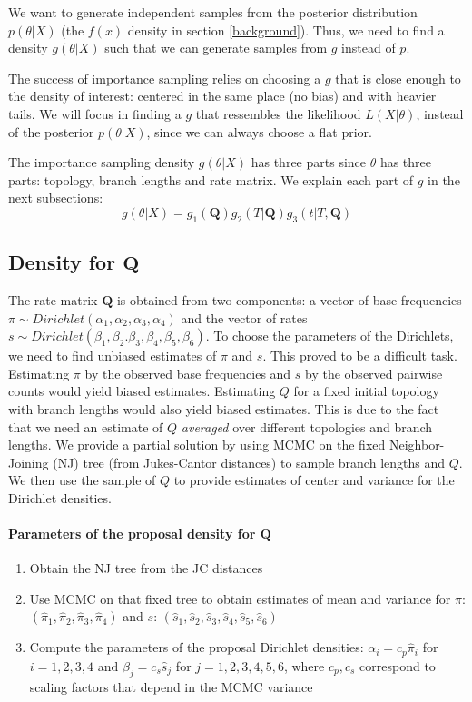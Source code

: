 \documentclass[useAMS,usenatbib]{biom}
\begin{document}
We want to generate independent samples from the posterior
distribution $p(\theta|X)$ (the $f(x)$ density in section
\ref{background}). Thus, we need to find a density $g(\theta|X)$ such
that we can generate samples from $g$ instead of $p$.

The success of importance sampling relies on choosing a $g$ that is
close enough to the density of interest: centered in the same place
(no bias) and with heavier tails. We will focus in finding a $g$ that
ressembles the likelihood $L(X|\theta)$, instead of the posterior
$p(\theta|X)$, since we can always choose a flat prior.

The importance sampling density $g(\theta|X)$ has three parts since
$\theta$ has three parts: topology, branch lengths and rate matrix. We
explain each part of $g$ in the next subsections:
\begin{equation}
g(\theta|X) = g_1(\mathbf{Q})g_2(T|\mathbf{Q})g_3(t|T,\mathbf{Q})
\end{equation}

\subsection{Density for $\mathbf{Q}$}
The rate matrix $\mathbf{Q}$ is obtained from two components: a vector
of base frequencies $\pi\sim
Dirichlet(\alpha_1,\alpha_2,\alpha_3,\alpha_4)$ and the vector of
rates $s\sim
Dirichlet(\beta_1,\beta_2.\beta_3,\beta_4,\beta_5,\beta_6)$. To choose
the parameters of the Dirichlets, we need to find unbiased estimates
of $\pi$ and $s$. This proved to be a difficult task. Estimating $\pi$
by the observed base frequencies and $s$ by the observed pairwise
counts would yield biased estimates. Estimating $Q$ for a fixed
initial topology with branch lengths would also yield biased
estimates. This is due to the fact that we need an estimate of $Q$
\textit{averaged} over different topologies and branch lengths.  We
provide a partial solution by using MCMC on the fixed Neighbor-Joining
(NJ) tree (from Jukes-Cantor distances) to sample branch lengths and
$Q$. We then use the sample of $Q$ to provide estimates of center and
variance for the Dirichlet densities.

\paragraph{Parameters of the proposal density for $\mathbf{Q}$}
\begin{enumerate}
\item{Obtain the NJ tree from the JC distances}
\item{Use MCMC on that fixed tree to obtain estimates of mean and
    variance for $\pi$:
    $(\hat{\pi}_1,\hat{\pi}_2,\hat{\pi}_3,\hat{\pi}_4)$ and $s$:
    $(\hat{s}_1,\hat{s}_2,\hat{s}_3,\hat{s}_4,\hat{s}_5,\hat{s}_6)$}
\item{Compute the parameters of the proposal Dirichlet densities:
    $\alpha_i=c_p\hat{\pi}_i$ for $i=1,2,3,4$ and
    $\beta_j=c_s\hat{s}_j$ for $j=1,2,3,4,5,6$, where $c_p,c_s$
    correspond to scaling factors that depend in the MCMC variance}
\end{enumerate}
\end{document}
